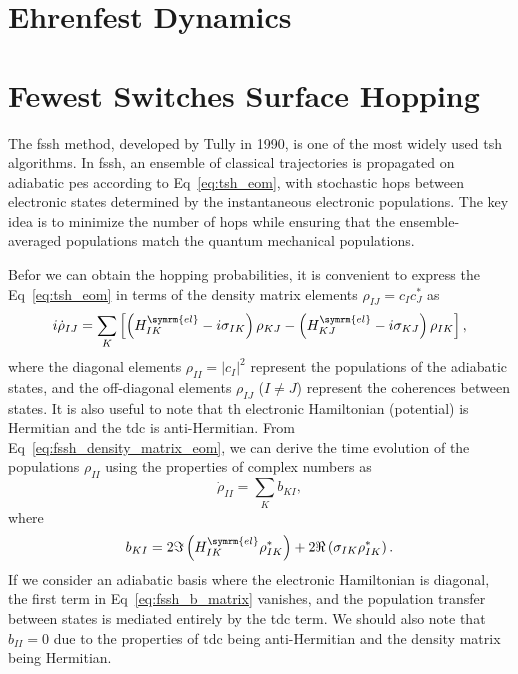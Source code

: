 \section{Ehrenfest Dynamics}\label{sec:ehrenfest_dynamics}
\section{Fewest Switches Surface Hopping}\label{sec:fewest_switches}
The \acrfull{fssh} method, developed by Tully in 1990,\supercite{10.1063/1.459170} is one of the most widely used \acrshort{tsh} algorithms. In \acrshort{fssh}, an ensemble of classical trajectories is propagated on adiabatic \acrshort{pes} according to Eq~\eqref{eq:tsh_eom}, with stochastic hops between electronic states determined by the instantaneous electronic populations. The key idea is to minimize the number of hops while ensuring that the ensemble-averaged populations match the quantum mechanical populations.

Befor we can obtain the hopping probabilities, it is convenient to express the Eq~\eqref{eq:tsh_eom} in terms of the density matrix elements $\rho_{IJ}=c_I c_J^\ast$ as
\begin{equation}\label{eq:fssh_density_matrix_eom}
i\dot\rho_{IJ}=\sum_K\left[\left(H_{IK}^{\symrm{el}}-i\sigma_{IK}\right)\rho_{KJ}-\left(H_{KJ}^{\symrm{el}}-i\sigma_{KJ}\right)\rho_{IK}\right],
\end{equation}
where the diagonal elements $\rho_{II}=\lvert c_I\rvert^2$ represent the populations of the adiabatic states, and the off-diagonal elements $\rho_{IJ}$ ($I\neq J$) represent the coherences between states. It is also useful to note that th electronic Hamiltonian (potential) is Hermitian and the \acrshort{tdc} is anti-Hermitian. From Eq~\eqref{eq:fssh_density_matrix_eom}, we can derive the time evolution of the populations $\rho_{II}$ using the properties of complex numbers as
\begin{equation}\label{eq:fssh_population_eom}
\dot\rho_{II}=\sum_K b_{KI},
\end{equation}
where
\begin{equation}\label{eq:fssh_b_matrix}
b_{KI}=2\Im\left(H_{IK}^{\symrm{el}}\rho_{IK}^\ast\right)+2\Re\left(\sigma_{IK}\rho_{IK}^\ast\right).
\end{equation}
If we consider an adiabatic basis where the electronic Hamiltonian is diagonal, the first term in Eq~\eqref{eq:fssh_b_matrix} vanishes, and the population transfer between states is mediated entirely by the \acrshort{tdc} term. We should also note that $b_{II}=0$ due to the properties of \acrshort{tdc} being anti-Hermitian and the density matrix being Hermitian.

